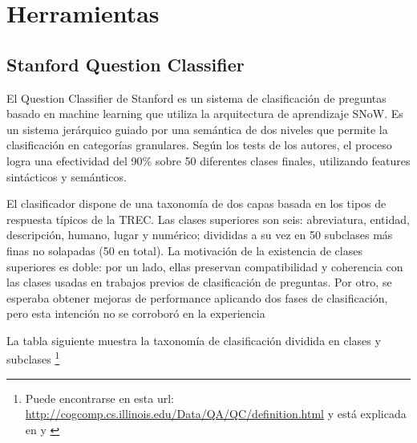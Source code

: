 \appendix
\chapter{Herramientas}
\label{chap:herramientas}

\section{Stanford Question Classifier}
\label{sec:stanford-qc}
El Question Classifier de Stanford \cite{QC2} es un sistema de clasificación de preguntas basado en machine learning que utiliza la arquitectura de aprendizaje SNoW. Es un sistema jerárquico guiado por una semántica de dos niveles que permite la clasificación en categorías granulares. Según los tests de los autores, el proceso logra una efectividad del 90\% sobre 50 diferentes clases finales, utilizando features sintácticos y semánticos. 

El clasificador dispone de una taxonomía de dos capas basada en los tipos de respuesta típicos de la TREC. Las clases superiores son seis: abreviatura, entidad, descripción, humano, lugar y numérico; divididas a su vez en 50 subclases más finas no solapadas (50 en total). La motivación de la existencia de clases superiores es doble: por un lado, ellas preservan compatibilidad y coherencia con las clases usadas en trabajos previos de clasificación de preguntas. Por otro, se esperaba obtener mejoras de performance aplicando dos fases de clasificación, pero esta intención no se corroboró en la experiencia

La tabla siguiente muestra la taxonomía de clasificación dividida en clases y subclases \footnote{Puede encontrarse en esta url: \url{http://cogcomp.cs.illinois.edu/Data/QA/QC/definition.html} y está explicada en \cite{QC2} y \cite{QC3}} 


